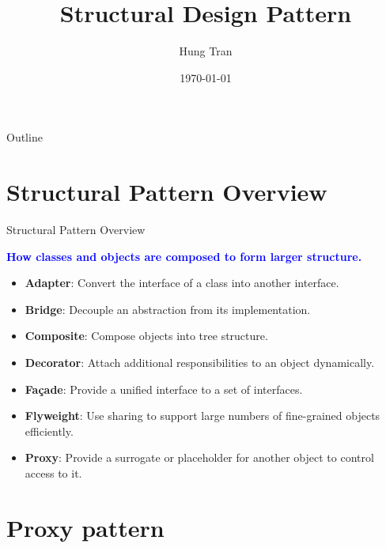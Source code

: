 \documentclass[13pt]{beamer}
\title[Design Pattern]{Structural Design Pattern}
\author{Hung Tran}
\institute{Fpt software}
\date{\today}
\begin{document}
\begin{frame}
\titlepage
\end{frame}

\begin{frame}{Outline}
\tableofcontents
\end{frame}

\section{Structural Pattern Overview}

\begin{frame}{Structural Pattern Overview}
	\begin{center}
	\textcolor{blue}{\textbf{How classes and objects are composed to form larger structure.}}
	\end{center}
	\begin{itemize}
		\item \textbf{Adapter}: Convert the interface of a class into another interface.
		\item \textbf{Bridge}: Decouple an abstraction from its implementation.
		\item \textbf{Composite}: Compose objects into tree structure.
		\item \textbf{Decorator}: Attach additional responsibilities to an object dynamically.
		\item \textbf{Façade}: Provide a unified interface to a set of interfaces.
		\item \textbf{Flyweight}: Use sharing to support large numbers of fine-grained objects efficiently.
		\item \textbf{Proxy}: Provide a surrogate or placeholder for another object to control access to it.
	\end{itemize}
\end{frame}

\section{Proxy pattern}
\end{document}
